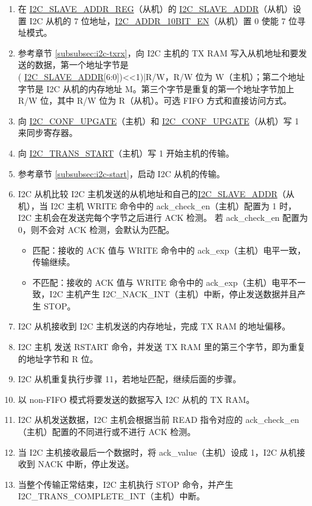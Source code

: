 \documentclass[main\_\_CN.tex]{subfiles}
\begin{document}
\begin{enumerate}
\item 在 \hyperref[regdesc:I2CSLAVEADDRREG]{I2C\_SLAVE\_ADDR\_REG}（从机）的 \hyperref[fielddesc:I2CSLAVEADDR]{I2C\_SLAVE\_ADDR}（从机）设置 I2C 从机的 7 位地址，\hyperref[fielddesc:I2CADDR10BITEN]{I2C\_ADDR\_10BIT\_EN}（从机）置 0 使能 7 位寻址模式。
\item 参考章节 \ref{subsubsec:i2c-txrx}，向 I2C 主机的 TX RAM 写入从机地址和要发送的数据，第一个地址字节是 \\( \hyperref[fielddesc:I2CSLAVEADDR]{I2C\_SLAVE\_ADDR}[6:0])<<1)|R/W，R/W 位为 W（主机）；第二个地址字节是 I2C 从机的内存地址 M。第三个字节是重复的第一个地址字节加上 R/W 位，其中 R/W 位为 R（从机）。可选 FIFO 方式和直接访问方式。
\item 向 \hyperref[fielddesc:I2CCONFUPGATE]{I2C\_CONF\_UPGATE}（主机）和 \hyperref[fielddesc:I2CCONFUPGATE]{I2C\_CONF\_UPGATE}（从机）写 1 来同步寄存器。
\item 向 \hyperref[fielddesc:I2CTRANSSTART]{I2C\_TRANS\_START}（主机）写 1 开始主机的传输。
\item 参考章节 \ref{subsubsec:i2c-start}，启动 I2C 从机的传输。
\item I2C 从机比较 I2C 主机发送的从机地址和自己的\hyperref[fielddesc:I2CSLAVEADDR]{I2C\_SLAVE\_ADDR}（从机），当 I2C 主机 WRITE 命令中的 ack\_check\_en（主机）配置为 1 时，I2C 主机会在发送完每个字节之后进行 ACK 检测。 若 ack\_check\_en 配置为 0，则不会对 ACK 检测，会默认为匹配。

\begin{itemize}
\item 匹配：接收的 ACK 值与 WRITE 命令中的 ack\_exp（主机）电平一致，传输继续。
\item 不匹配：接收的 ACK 值与 WRITE 命令中的 ack\_exp（主机）电平不一致，I2C 主机产生 I2C\_NACK\_INT（主机）中断，停止发送数据并且产生 STOP。
\end{itemize}

\item I2C 从机接收到 I2C 主机发送的内存地址，完成 TX RAM 的地址偏移。
\item I2C 主机 发送 RSTART 命令，并发送 TX RAM 里的第三个字节，即为重复的地址字节和 R 位。
\item I2C 从机重复执行步骤 11，若地址匹配，继续后面的步骤。
\item 以 non-FIFO 模式将要发送的数据写入 I2C 从机的 TX RAM。
\item I2C 从机发送数据，I2C 主机会根据当前 READ 指令对应的 ack\_check\_en（主机）配置的不同进行或不进行 ACK 检测。
\item 当 I2C 主机接收最后一个数据时，将 ack\_value（主机）设成 1，I2C 从机接收到 NACK 中断，停止发送。
\item 当整个传输正常结束，I2C 主机执行 STOP 命令，并产生 I2C\_TRANS\_COMPLETE\_INT（主机）中断。
\end{enumerate}
\end{document}
